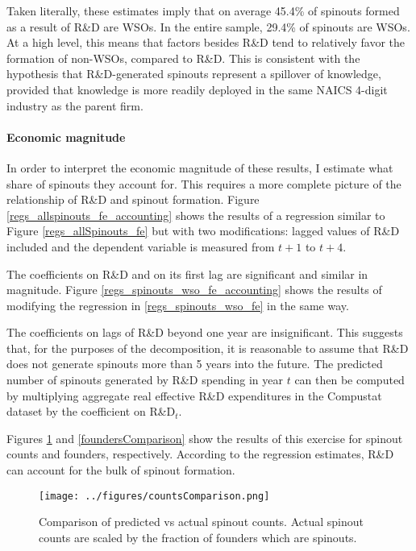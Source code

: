 \documentclass[12pt,english]{article}
\theoremstyle{remark}
\begin{document}
Taken literally, these estimates imply that on average 45.4\% of spinouts formed as a result of R\&D are WSOs. In the entire sample, 29.4\% of spinouts are WSOs. At a high level, this means that factors besides R\&D tend to relatively favor the formation of non-WSOs, compared to R\&D. This is consistent with the hypothesis that R\&D-generated spinouts represent a spillover of knowledge, provided that knowledge is more readily deployed in the same NAICS 4-digit industry as the parent firm. 

\paragraph{Economic magnitude}
 
In order to interpret the economic magnitude of these results, I estimate what share of spinouts they account for. This requires a more complete picture of the relationship of R\&D and spinout formation. Figure \ref{regs_allspinouts_fe_accounting} shows the results of a regression similar to Figure \ref{regs_allSpinouts_fe} but with two modifications: lagged values of R\&D included and the dependent variable is measured from $t+1$ to $t+4$. 

The coefficients on R\&D and on its first lag are significant and similar in magnitude. Figure \ref{regs_spinouts_wso_fe_accounting} shows the results of modifying the regression in \ref{regs_spinouts_wso_fe} in the same way. 

The coefficients on lags of R\&D beyond one year are insignificant. This suggests that, for the purposes of the decomposition, it is reasonable to assume that R\&D does not generate spinouts more than 5 years into the future. The predicted number of spinouts generated by R\&D spending in year $t$ can then be computed by multiplying aggregate real effective R\&D expenditures in the Compustat dataset by the coefficient on R\&D$_t$. 

Figures \ref{countsComparison} and \ref{foundersComparison} show the results of this exercise for spinout counts and founders, respectively. According to the regression estimates, R\&D can account for the bulk of spinout formation. 

\begin{figure}[p]
	\centering
	\texttt{[image: ../figures/countsComparison.png]}
	\caption{Comparison of predicted vs actual spinout counts. Actual spinout counts are scaled by the fraction of founders which are spinouts.}
	\label{countsComparison}
\end{figure}
\end{document}
